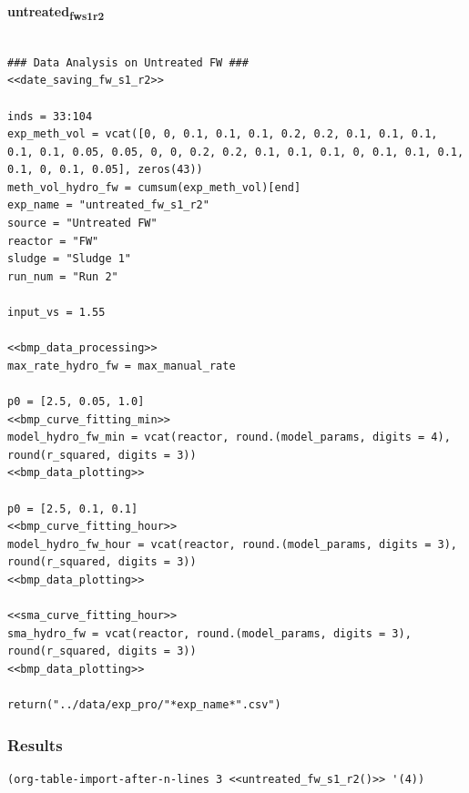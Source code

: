 \documentclass[11pt]{article}
\begin{document}
\textbf{untreated\textsubscript{fw}\textsubscript{s1}\textsubscript{r2}}
\begin{verbatim}

### Data Analysis on Untreated FW ###
<<date_saving_fw_s1_r2>>

inds = 33:104
exp_meth_vol = vcat([0, 0, 0.1, 0.1, 0.1, 0.2, 0.2, 0.1, 0.1, 0.1, 0.1, 0.1, 0.05, 0.05, 0, 0, 0.2, 0.2, 0.1, 0.1, 0.1, 0, 0.1, 0.1, 0.1, 0.1, 0, 0.1, 0.05], zeros(43))
meth_vol_hydro_fw = cumsum(exp_meth_vol)[end]
exp_name = "untreated_fw_s1_r2"
source = "Untreated FW"
reactor = "FW"
sludge = "Sludge 1"
run_num = "Run 2"

input_vs = 1.55

<<bmp_data_processing>>
max_rate_hydro_fw = max_manual_rate

p0 = [2.5, 0.05, 1.0]
<<bmp_curve_fitting_min>>
model_hydro_fw_min = vcat(reactor, round.(model_params, digits = 4), round(r_squared, digits = 3))
<<bmp_data_plotting>>

p0 = [2.5, 0.1, 0.1]
<<bmp_curve_fitting_hour>>
model_hydro_fw_hour = vcat(reactor, round.(model_params, digits = 3), round(r_squared, digits = 3))
<<bmp_data_plotting>>

<<sma_curve_fitting_hour>>
sma_hydro_fw = vcat(reactor, round.(model_params, digits = 3), round(r_squared, digits = 3))
<<bmp_data_plotting>>

return("../data/exp_pro/"*exp_name*".csv")

\end{verbatim}

\subsubsection{Results}
\label{sec:org14dc996}

\begin{verbatim}
(org-table-import-after-n-lines 3 <<untreated_fw_s1_r2()>> '(4))
\end{verbatim}
\end{document}
